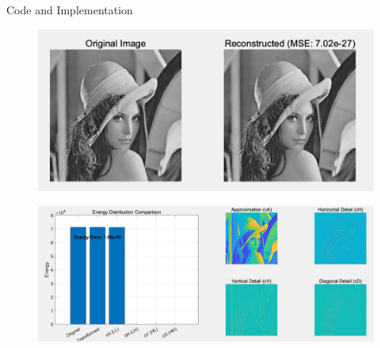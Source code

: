 \documentclass{beamer}
\begin{document}
\begin{frame}{Code and Implementation}
    \begin{figure}
        \centering
        \includegraphics[width=0.5\linewidth]{fig/图像1.png}

    \end{figure}

    \begin{figure}
        \centering
        \includegraphics[width=0.75\linewidth]{fig/图片4.jpg}

    \end{figure}
\end{frame}

\end{document}
